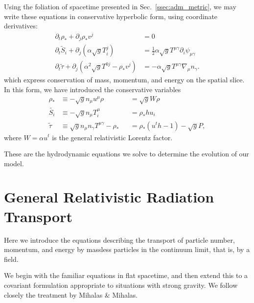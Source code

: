 Using the foliation of spacetime presented in Sec.~\ref{ssec:adm_metric}, we may
write these equations in conservative hyperbolic form,
using coordinate derivatives:
\begin{align}
  \label{eqn:adm_hydro_mass}
  \partial_t \rho_* + \partial_j \rho_* v^j &= 0 \\
  \label{eqn:adm_hydro_mom}
  \partial_t \tilde{S}_i + \partial_j(\alpha\sqrt{g}T^j_i) &=
  \frac{1}{2}\alpha\sqrt{g}T^{\mu\gamma}\partial_i\psi_{\mu\gamma} \\
  \label{eqn:adm_hydro_ener}
  \partial_t \tilde{\tau} + \partial_j(\alpha^2\sqrt{g}T^{0j}-\rho_*v^j) &=
  -\alpha\sqrt{g}T^{\mu\gamma}\nabla_\mu n_\gamma.
\end{align}
which express conservation of mass, momentum, and energy on the spatial slice.
In this form, we have introduced the conservative variables
\begin{align}
  \label{eqn:rhostar}
  \rho_*       &\equiv -\sqrt{g} n_\mu u^\mu \rho &&= \sqrt{g}W\rho \\
  \label{eqn:tildeS}
  \tilde{S_i}  &\equiv -\sqrt{g} n_\mu T^\mu_i    &&= \rho_* h u_i \\
  \label{eqn:tildetau}
  \tilde{\tau} &\equiv  \sqrt{g} n_\mu n_\gamma T^{\mu\gamma} - \rho_*
  &&= \rho_*(u^t h-1)-\sqrt{g}P,
\end{align}
where $W=\alpha u^t$ is the general relativistic Lorentz factor.

These are the hydrodynamic equations we solve to determine the evolution of
our model.

\section{General Relativistic Radiation Transport}
\label{sec:rad_transport}
Here we introduce the equations describing the transport of particle number,
momentum, and energy by massless particles in the continuum limit, that is,
by a field.

We begin with the familiar equations in flat spacetime, and then extend this
to a covariant formulation appropriate to situations with strong gravity.
We follow closely the treatment by Mihalas \& Mihalas.

